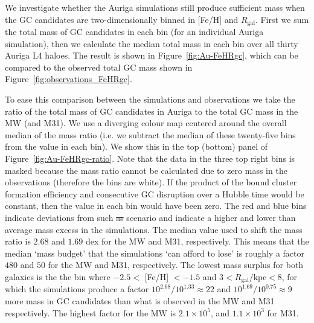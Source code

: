 \documentclass[a4paper,fleqn,usenatbib]{mnras}
\providecommand{\DIFadd}[1]{{\protect\color{blue}\uwave{#1}}} %
\providecommand{\DIFdel}[1]{{\protect\color{red}\sout{#1}}}                      %
\providecommand{\DIFaddbegin}{} %
\providecommand{\DIFaddend}{} %
\providecommand{\DIFdelbegin}{} %
\providecommand{\DIFdelend}{} %
\newcommand{\DIFscaledelfig}{0.5}
\newlength{\DIFdelgraphicswidth} %
\newlength{\DIFdelgraphicsheight} %
\newcommand{\DIFaddincludegraphics}[2][]{{\color{blue}\fbox{\DIFOincludegraphics[#1]{#2}}}} %
\newcommand{\DIFdelincludegraphics}[2][]{%
\sbox{\DIFdelgraphicsbox}{\DIFOincludegraphics[#1]{#2}}%
\settoboxwidth{\DIFdelgraphicswidth}{\DIFdelgraphicsbox} %
\settoboxtotalheight{\DIFdelgraphicsheight}{\DIFdelgraphicsbox} %
\scalebox{\DIFscaledelfig}{%
\parbox[b]{\DIFdelgraphicswidth}{\usebox{\DIFdelgraphicsbox}\\[-\baselineskip] \rule{\DIFdelgraphicswidth}{0em}}\llap{\resizebox{\DIFdelgraphicswidth}{\DIFdelgraphicsheight}{%
\setlength{\unitlength}{\DIFdelgraphicswidth}%
\begin{picture}(1,1)%
\thicklines\linethickness{2pt} %
{\color[rgb]{1,0,0}\put(0,0){\framebox(1,1){}}}%
{\color[rgb]{1,0,0}\put(0,0){\line( 1,1){1}}}%
{\color[rgb]{1,0,0}\put(0,1){\line(1,-1){1}}}%
\end{picture}%
}\hspace*{3pt}}} %
} %
\DeclareRobustCommand{\DIFaddbegin}{\DIFOaddbegin \let\includegraphics\DIFaddincludegraphics} %
\DeclareRobustCommand{\DIFaddend}{\DIFOaddend \let\includegraphics\DIFOincludegraphics} %
\DeclareRobustCommand{\DIFdelbegin}{\DIFOdelbegin \let\includegraphics\DIFdelincludegraphics} %
\DeclareRobustCommand{\DIFdelend}{\DIFOaddend \let\includegraphics\DIFOincludegraphics} %
\begin{document}
We investigate whether the Auriga simulations still produce sufficient mass when
the GC candidates are two-dimensionally binned in [Fe/H] and \DIFdelbegin \DIFdel{$R_\text{gal}$}\DIFdelend \DIFaddbegin \DIFadd{$r_\text{gal}$}\DIFaddend . First
we sum the total mass of GC candidates in each bin (for an individual Auriga 
simulation), then we calculate the median total mass in each bin over all 
thirty Auriga L4 haloes. The result is shown in Figure~\ref{fig:Au-FeHRgc}, which 
can be compared to the observed total GC mass shown in 
Figure~\ref{fig:observations_FeHRgc}.

To ease this comparison between the simulations and observations we take the ratio
of the total mass of GC candidates in Auriga to the total GC mass in the MW 
(and M31). We use a diverging colour map centered around the overall median of the 
mass ratio (i.e. we subtract the median of these twenty-five bins from the value 
in each bin). We show this in the top (bottom) panel of Figure~\ref{fig:Au-FeHRgc-ratio}.
Note that the data in the three top right bins is masked because the mass ratio cannot 
be calculated due to zero mass in the observations (therefore the bins are white).
If the product of the bound cluster formation efficiency and consecutive GC 
disruption over a Hubble time would be constant, then the value in each bin would
have been zero. The red and blue bins indicate deviations from such \DIFdelbegin \DIFdel{as }\DIFdelend \DIFaddbegin \DIFadd{a }\DIFaddend scenario and
indicate a higher and lower than average mass excess in the simulations. The median 
value used to shift the mass ratio is $2.68$ and $1.69$ dex for the MW and M31, 
respectively. This means that the median `mass budget' that the simulations `can 
afford to lose' is roughly a factor $480$ and $50$ for the MW and M31, respectively. 
The lowest mass surplus for both galaxies is the the bin where $-2.5 <$ [Fe/H] 
$< -1.5$ and \DIFdelbegin \DIFdel{$3 < R_{\text{gal}}/\text{kpc} < 8$}\DIFdelend \DIFaddbegin \DIFadd{$3 < r_{\text{gal}}/\text{kpc} < 8$}\DIFaddend , for which the simulations produce 
a factor $10^{2.68}/10^{1.33} \approx 22$ and $10^{1.69}/10^{0.75} \approx 9$ 
more mass in GC candidates than what is observed in the MW and M31 respectively.
The highest factor for the MW is $2.1 \times 10^{5}$, and $1.1 \times 10^{3}$
for M31.
\end{document}

